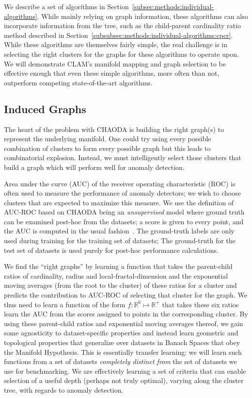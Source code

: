 We describe a set of algorithms in Section~\ref{subsec:methods:individual-algorithms}.
While mainly relying on graph information, these algorithms can also incorporate information from the tree, such as the child-parent cardinality ratio method described in Section~\ref{subsubsec:methods:individual-algorithms:cpcr}.
While these algorithms are themselves fairly simple, the real challenge is in selecting the right clusters for the graphs for these algorithms to operate upon.
We will demonstrate CLAM's manifold mapping and graph selection to be effective enough that even these simple algorithms, more often than not, outperform competing state-of-the-art algorithms.


\subsection{Induced Graphs}
\label{subsec:methods:induced-graphs}

The heart of the problem with CHAODA is building the right graph(s) to represent the underlying manifold.
One could try using every possible combination of clusters to form every possible graph but this leads to combinatorial explosion.
Instead, we must intelligently select those clusters that build a graph which will perform well for anomaly detection.

Area under the curve (AUC) of the receiver operating characteristic (ROC) is often used to measure the performance of anomaly detectors;
we wish to choose clusters that are expected to maximize this measure.
We use the definition of AUC-ROC based on CHAODA being an \emph{unsupervised} model where ground truth can be examined post-hoc from the datasets; a score is given to every point, and the AUC is computed in the usual fashion~\cite{fawcett2006introduction}.
The ground-truth labels are only used during training for the training set of datasets;
The ground-truth for the test set of datasets is used purely for post-hoc performance calculations.

We find the ``right graphs'' by learning a function that takes the parent-child ratios of cardinality, radius and local-fractal-dimension and the exponential moving averages (from the root to the cluster) of these ratios for a cluster and predicts the contribution to AUC-ROC of selecting that cluster for the graph.
We thus need to learn a function of the form $f: \mathbb{R}^6 \mapsto \mathbb{R}^+$ that takes these six ratios learn the AUC from the scores assigned to points in the corresponding cluster.
By using these parent-child ratios and exponential moving averages thereof, we gain some agnosticity to dataset-specific properties and instead learn geometric and topological properties that generalize over datasets in Banach Spaces that obey the Manifold Hypothesis.
This is essentially transfer learning: we will learn such functions from a set of datasets \emph{completely distinct from} the set of datasets we use for benchmarking.
We are effectively learning a set of criteria that can enable selection of a useful depth (perhaps not truly optimal), varying along the cluster tree, with regards to anomaly detection.

